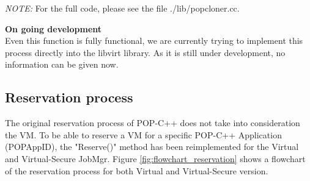 \textit{NOTE:} For the full code, please see the file ./lib/popcloner.cc.

\textbf{On going development}\\
Even this function is fully functional, we are currently trying to implement this process directly into the libvirt library. As it is still under development, no information can be given now. 







\pagebreak
\subsection{Reservation process}
The original reservation process of POP-C++ does not take into consideration the VM. To be able to reserve a VM for a specific POP-C++ Application (POPAppID), the "Reserve()" method has been reimplemented for the Virtual and Virtual-Secure JobMgr. Figure \ref{fig:flowchart_reservation} shows a flowchart of the reservation process for both Virtual and Virtual-Secure version. \s

